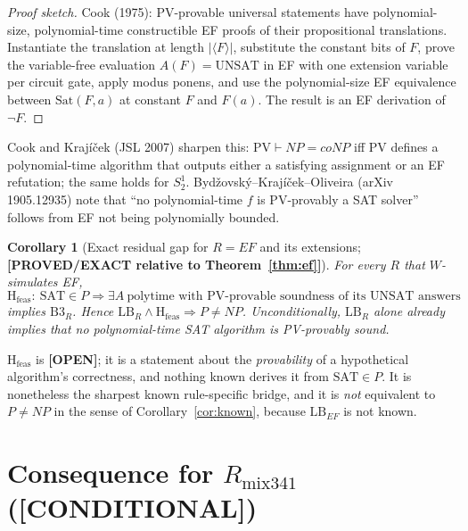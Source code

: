 \documentclass[11pt]{article}
\newtheorem{corollary}[theorem]{Corollary}
\theoremstyle{definition}
\theoremstyle{remark}
\newcommand{\SAT}{\mathrm{SAT}}
\newcommand{\UNSAT}{\mathrm{UNSAT}}
\newcommand{\status}[1]{\textbf{[#1]}}
\begin{document}
\begin{proof}[Proof sketch]
Cook (1975): PV-provable universal statements have polynomial-size,
polynomial-time constructible EF proofs of their propositional translations.
Instantiate the translation at length $|\langle F\rangle|$, substitute the
constant bits of $F$, prove the variable-free evaluation $A(F)=\UNSAT$ in EF with
one extension variable per circuit gate, apply modus ponens, and use the
polynomial-size EF equivalence between $\mathrm{Sat}(F,a)$ at constant $F$ and
$F(a)$. The result is an EF derivation of $\neg F$.
\end{proof}

Cook and Kraj\'i\v{c}ek (JSL 2007) sharpen this:
$\mathrm{PV}\vdash NP=coNP$ iff PV defines a polynomial-time algorithm that
outputs either a satisfying assignment or an EF refutation; the same holds for
$S^1_2$. Byd\v{z}ovsk\'y--Kraj\'i\v{c}ek--Oliveira (arXiv 1905.12935) note that
``no polynomial-time $f$ is PV-provably a SAT solver'' follows from EF not being
polynomially bounded.

\begin{corollary}[Exact residual gap for $R=EF$ and its extensions; \status{PROVED/EXACT relative to Theorem~\ref{thm:ef}}]
For every $R$ that $W$-simulates EF,
\[
\mathrm{H}_{\mathrm{feas}}:\ \SAT\in P\Rightarrow\exists A\ \text{polytime with PV-provable soundness of its UNSAT answers}
\]
implies $\mathrm{B3}_R$. Hence $\mathrm{LB}_R\wedge\mathrm{H}_{\mathrm{feas}}\Rightarrow P\ne NP$.
Unconditionally, $\mathrm{LB}_{R}$ alone already implies that no polynomial-time
SAT algorithm is PV-provably sound.
\end{corollary}

$\mathrm{H}_{\mathrm{feas}}$ is \status{OPEN}; it is a statement about the
\emph{provability} of a hypothetical algorithm's correctness, and nothing known
derives it from $\SAT\in P$. It is nonetheless the sharpest known
rule-specific bridge, and it is \emph{not} equivalent to $P\ne NP$ in the sense
of Corollary~\ref{cor:known}, because $\mathrm{LB}_{EF}$ is not known.

\section{Consequence for $R_{\mathrm{mix341}}$ (\status{CONDITIONAL})}
\end{document}
